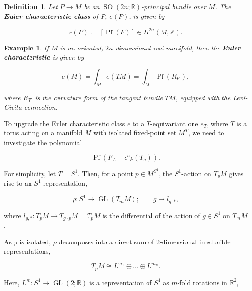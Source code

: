 \documentclass{article}
\newtheorem{defn}[theorem]{Definition\rm}
\newtheorem{example}{Example}
\newcommand{\ra}{\rightarrow}
\newcommand{\lra}{\longrightarrow}
\newcommand{\e}{\epsilon}
\newcommand{\RR}{\mathbb{R}}
\newcommand{\ZZ}{\mathbb{Z}}
\DeclareMathOperator{\Pf}{Pf}
\DeclareMathOperator{\GL}{GL}
\DeclareMathOperator{\SO}{SO}
\begin{document}
\begin{defn}
	
	Let $P \ra M$ be an $\SO(2n;\RR)$-principal bundle over $M$. The \textbf{Euler characteristic class} of $P$, $e(P)$, is given by
	
	\begin{equation*}
		e(P) := [\Pf(F)] \in H^{2n}(M; \ZZ).
	\end{equation*}

\end{defn}

\begin{example}
	If $M$ is an oriented, $2n$-dimensional real manifold, then the \textbf{Euler characteristic} is given by

	\begin{equation*}
		e(M) = \int_{M} e(TM) = \int_{M} \Pf(R_{\nabla}),
	\end{equation*}

	where $R_{\nabla}$ is the curvature form of the tangent bundle $TM$, equipped with the Levi-Civita connection.
\end{example}

To upgrade the Euler characteristic class $e$ to a $T$-equivariant one $e_{T}$, where $T$ is a torus acting on a manifold $M$ with isolated fixed-point set $M^{T}$, we need to investigate the polynomial

\begin{equation*}
	\Pf(F_{A} + \e^{a}\rho(T_{a})).
\end{equation*}

For simplicity, let $T = S^{1}$. Then, for a point $p \in M^{S^{1}}$, the $S^{1}$-action on $T_{p}M$ gives rise to an $S^{1}$-representation,

\begin{equation*}
	\rho : S^{1} \lra \GL(T_{m}M); \qquad g \longmapsto l_{g, \ast},
\end{equation*}

where $l_{g, \ast} : T_{p}M \ra T_{g\cdot p}M = T_{p}M$ is the differential of the action of $g \in S^{1}$ on $T_{m}M$.

As $p$ is isolated, $\rho$ decomposes into a direct sum of $2$-dimensional irreducible representations,

\begin{equation*}
	T_{p}M \cong L^{m_{1}} \oplus \ldots \oplus L^{m_{n}}.
\end{equation*}

Here, $L^{m} : S^{1} \ra \GL(2;\RR)$ is a representation of $S^{1}$ as $m$-fold rotations in $\RR^{2}$,
\end{document}
